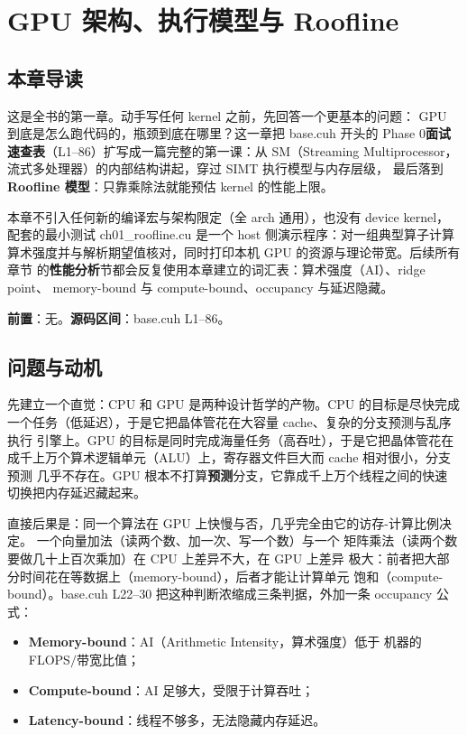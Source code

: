 \chapter{GPU 架构、执行模型与 Roofline}\label{ch:01}

\section{本章导读}

这是全书的第一章。动手写任何 kernel 之前，先回答一个更基本的问题：
GPU 到底是怎么跑代码的，瓶颈到底在哪里？这一章把 base.cuh 开头的
Phase 0\textbf{面试速查表}（L1--86）扩写成一篇完整的第一课：从 SM（Streaming
Multiprocessor，流式多处理器）的内部结构讲起，穿过 SIMT 执行模型与内存层级，
最后落到 \textbf{Roofline 模型}：只靠乘除法就能预估 kernel 的性能上限。

本章不引入任何新的编译宏与架构限定（全 arch 通用），也没有 device kernel，
配套的最小测试 ch01\_roofline.cu 是一个 host 侧演示程序：对一组典型算子计算
算术强度并与解析期望值核对，同时打印本机 GPU 的资源与理论带宽。后续所有章节
的\textbf{性能分析}节都会反复使用本章建立的词汇表：算术强度（AI）、ridge point、
memory-bound 与 compute-bound、occupancy 与延迟隐藏。

\textbf{前置}：无。\textbf{源码区间}：base.cuh L1--86。

\section{问题与动机}

先建立一个直觉：CPU 和 GPU 是两种设计哲学的产物。CPU 的目标是尽快完成
一个任务（低延迟），于是它把晶体管花在大容量 cache、复杂的分支预测与乱序执行
引擎上。GPU 的目标是同时完成海量任务（高吞吐），于是它把晶体管花在
成千上万个算术逻辑单元（ALU）上，寄存器文件巨大而 cache 相对很小，分支预测
几乎不存在。GPU 根本不打算\textbf{预测}分支，它靠成千上万个线程之间的快速
切换把内存延迟藏起来。

直接后果是：同一个算法在 GPU 上快慢与否，几乎完全由它的访存-计算比例决定。
一个向量加法（读两个数、加一次、写一个数）与一个
矩阵乘法（读两个数要做几十上百次乘加）在 CPU 上差异不大，在 GPU 上差异
极大：前者把大部分时间花在等数据上（memory-bound），后者才能让计算单元
饱和（compute-bound）。base.cuh L22--30 把这种判断浓缩成三条判据，外加一条
occupancy 公式：

\begin{itemize}
\item \textbf{Memory-bound}：AI（Arithmetic Intensity，算术强度）低于
  机器的 FLOPS$/$带宽比值；
\item \textbf{Compute-bound}：AI 足够大，受限于计算吞吐；
\item \textbf{Latency-bound}：线程不够多，无法隐藏内存延迟。
\end{itemize}

